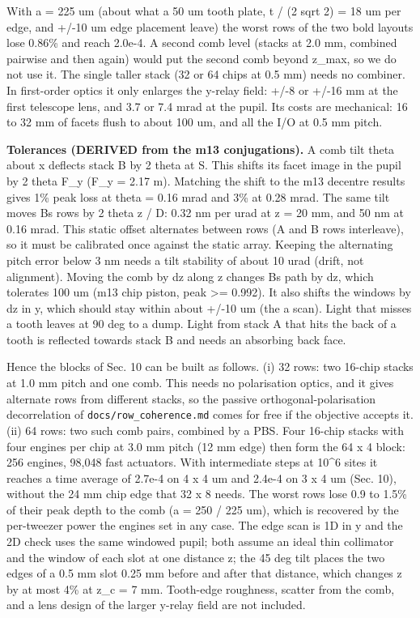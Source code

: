 With a = 225 um (about what a 50 um tooth plate, t / (2 sqrt 2) = 18 um
per edge, and +/-10 um edge placement leave) the worst rows of the two
bold layouts lose 0.86\% and reach 2.0e-4. A second comb level (stacks
at 2.0 mm, combined pairwise and then again) would put the second comb
beyond z\_max, so we do not use it. The single taller stack (32 or 64
chips at 0.5 mm) needs no combiner. In first-order optics it only
enlarges the y-relay field: +/-8 or +/-16 mm at the first telescope
lens, and 3.7 or 7.4 mrad at the pupil. Its costs are mechanical: 16 to
32 mm of facets flush to about 100 um, and all the I/O at 0.5 mm pitch.

\textbf{Tolerances (DERIVED from the m13 conjugations).} A comb tilt
theta about x deflects stack B by 2 theta at S. This shifts its facet
image in the pupil by 2 theta F\_y (F\_y = 2.17 m). Matching the shift
to the m13 decentre results gives 1\% peak loss at theta = 0.16 mrad and
3\% at 0.28 mrad. The same tilt moves B\textquotesingle s rows by 2
theta z / D: 0.32 nm per urad at z = 20 mm, and 50 nm at 0.16 mrad. This
static offset alternates between rows (A and B rows interleave), so it
must be calibrated once against the static array. Keeping the
alternating pitch error below 3 nm needs a tilt stability of about 10
urad (drift, not alignment). Moving the comb by dz along z changes
B\textquotesingle s path by dz, which tolerates 100 um (m13 chip piston,
peak \textgreater= 0.992). It also shifts the windows by dz in y, which
should stay within about +/-10 um (the a scan). Light that misses a
tooth leaves at 90 deg to a dump. Light from stack A that hits the back
of a tooth is reflected towards stack B and needs an absorbing back
face.

Hence the blocks of Sec. 10 can be built as follows. (i) 32 rows: two
16-chip stacks at 1.0 mm pitch and one comb. This needs no polarisation
optics, and it gives alternate rows from different stacks, so the
passive orthogonal-polarisation decorrelation of
\texttt{docs/row\_coherence.md} comes for free if the objective accepts
it. (ii) 64 rows: two such comb pairs, combined by a PBS. Four 16-chip
stacks with four engines per chip at 3.0 mm pitch (12 mm edge) then form
the 64 x 4 block: 256 engines, 98,048 fast actuators. With intermediate
steps at 10\^{}6 sites it reaches a time average of 2.7e-4 on 4 x 4 um
and 2.4e-4 on 3 x 4 um (Sec. 10), without the 24 mm chip edge that 32 x
8 needs. The worst rows lose 0.9 to 1.5\% of their peak depth to the
comb (a = 250 / 225 um), which is recovered by the per-tweezer power the
engines set in any case. The edge scan is 1D in y and the 2D check uses
the same windowed pupil; both assume an ideal thin collimator and the
window of each slot at one distance z; the 45 deg tilt places the two
edges of a 0.5 mm slot 0.25 mm before and after that distance, which
changes z by at most 4\% at z\_c = 7 mm. Tooth-edge roughness, scatter
from the comb, and a lens design of the larger y-relay field are not
included.

